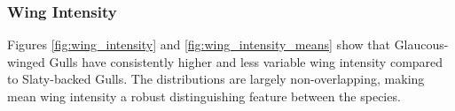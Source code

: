 \documentclass[a4paper,12pt]{report}
\begin{document}


\subsubsection{Wing Intensity}
Figures \ref{fig:wing_intensity} and \ref{fig:wing_intensity_means} show that Glaucous-winged Gulls have consistently higher and less variable wing intensity compared to Slaty-backed Gulls. The distributions are largely non-overlapping, making mean wing intensity a robust distinguishing feature between the species.
\end{document}
